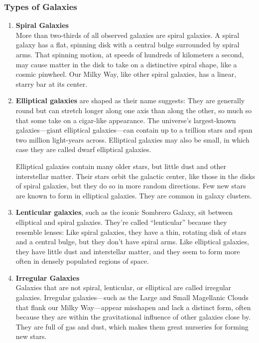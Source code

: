 \documentclass{article}
\begin{document}
\subsubsection{Types of Galaxies}
\begin{enumerate}
    \item \textbf{Spiral Galaxies}\\
    More than two-thirds of all observed galaxies are spiral galaxies. A spiral galaxy has a flat, spinning disk with a central bulge surrounded by spiral arms. That spinning motion, at speeds of hundreds of kilometers a second, may cause matter in the disk to take on a distinctive spiral shape, like a cosmic pinwheel. Our Milky Way, like other spiral galaxies, has a linear, starry bar at its center.
    \item \textbf{Elliptical galaxies} are shaped as their name suggests: They are generally round but can stretch longer along one axis than along the other, so much so that some take on a cigar-like appearance. The universe's largest-known galaxies—giant elliptical galaxies—can contain up to a trillion stars and span two million light-years across. Elliptical galaxies may also be small, in which case they are called dwarf elliptical galaxies.
    
    Elliptical galaxies contain many older stars, but little dust and other interstellar matter. Their stars orbit the galactic center, like those in the disks of spiral galaxies, but they do so in more random directions. Few new stars are known to form in elliptical galaxies. They are common in galaxy clusters.
    
    \item \textbf{Lenticular galaxies}, such as the iconic Sombrero Galaxy, sit between elliptical and spiral galaxies. They're called “lenticular” because they resemble lenses: Like spiral galaxies, they have a thin, rotating disk of stars and a central bulge, but they don't have spiral arms. Like elliptical galaxies, they have little dust and interstellar matter, and they seem to form more often in densely populated regions of space.
    \item \textbf{Irregular Galaxies}\\
    Galaxies that are not spiral, lenticular, or elliptical are called irregular galaxies. Irregular galaxies—such as the Large and Small Magellanic Clouds that flank our Milky Way—appear misshapen and lack a distinct form, often because they are within the gravitational influence of other galaxies close by. They are full of gas and dust, which makes them great nurseries for forming new stars.
\end{enumerate}
\end{document}
